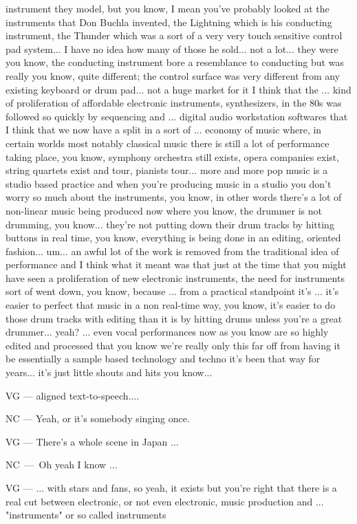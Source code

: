 instrument they model, but you know, I mean you've probably looked at the instruments that Don Buchla invented, the Lightning which is his conducting instrument, the Thunder which was a sort of a very very touch sensitive control pad system... I have no idea how many of those he sold... not a lot... they were you know, the conducting instrument bore a resemblance to conducting but was really you know, quite different; the control surface was very different from any existing keyboard or drum pad... not a huge market for it I think that the ... kind of proliferation of affordable electronic instruments, synthesizers, in the 80s was followed so quickly by sequencing and ... digital audio workstation softwares that I think that we now have a split in a sort of ... economy of music where, in certain worlds most notably classical music there is still a lot of performance taking place, you know, symphony orchestra still exists, opera companies exist, string quartets exist and tour, pianists tour... more and more pop music is a studio based practice and when you're producing music in a studio you don't worry so much about the instruments, you know, in other words there's a lot of non-linear music being produced now where you know, the drummer is not drumming, you know... they're not putting down their drum tracks by hitting buttons in real time, you know, everything is being done in an editing, oriented fashion... um... an awful lot of the work is removed from the traditional idea of performance and I think what it meant was that just at the time that you might have seen a proliferation of new electronic instruments, the need for instruments sort of went down, you know, because ... from a practical standpoint it's ... it's easier to perfect that music in a non real-time way, you know,  it's easier to do those drum tracks with editing than it is by hitting drums unless you're a great drummer... yeah? ... even vocal performances now as you know are so highly edited and processed that you know we're really only this far off from having it be essentially a sample based technology and techno it's been that way for years...  it's just little shouts and hits you know... 

VG — aligned text-to-speech.... 

NC — Yeah, or it's somebody singing once. 

VG — There's a whole scene in Japan ...

NC — Oh yeah I know ...

VG — ... with stars and fans, so yeah, it exists but you're right that there is a real cut between  electronic, or not even electronic, music production and ... "instruments" or so called instruments 

